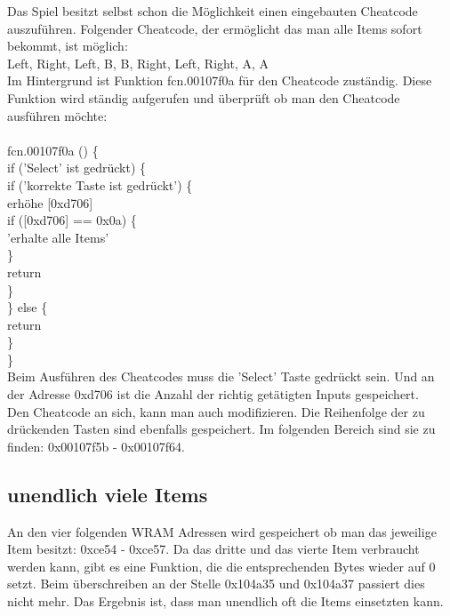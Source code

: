 Das Spiel besitzt selbst schon die Möglichkeit einen eingebauten Cheatcode auszuführen. Folgender Cheatcode, der ermöglicht das man
alle Items sofort bekommt, ist möglich: \\ 
Left, Right, Left, B, B, Right, Left, Right, A, A \\
Im Hintergrund ist Funktion fcn.00107f0a für den Cheatcode zuständig.
Diese Funktion wird ständig aufgerufen und überprüft ob man den Cheatcode ausführen möchte:\\\\
fcn.00107f0a () \{ \\
\hspace*{2em} if ('Select' ist gedrückt) \{ \\
\hspace*{4em} if ('korrekte Taste ist gedrückt') \{\\
\hspace*{6em} erhöhe [0xd706]\\
\hspace*{6em} if ([0xd706] == 0x0a) \{\\
\hspace*{8em} 'erhalte alle Items'\\
\hspace*{6em} \}\\
\hspace*{6em} return\\
\hspace*{4em} \}\\
\hspace*{2em} \} else \{\\
\hspace*{4em} return\\
\hspace*{2em} \}\\
\}\\

Beim Ausführen des Cheatcodes muss die 'Select' Taste gedrückt sein. Und an der Adresse 0xd706 ist die Anzahl der richtig getätigten Inputs gespeichert.\\

Den Cheatcode an sich, kann man auch modifizieren. Die Reihenfolge der zu drückenden Tasten sind ebenfalls gespeichert. Im folgenden Bereich
sind sie zu finden: 0x00107f5b - 0x00107f64.

\subsection{unendlich viele Items}

An den vier folgenden WRAM Adressen wird gespeichert ob man das jeweilige Item besitzt: 0xce54 - 0xce57. Da das dritte und das vierte Item verbraucht werden kann, 
gibt es eine Funktion, die die entsprechenden Bytes wieder auf 0 setzt. Beim überschreiben an der Stelle 0x104a35 und 0x104a37 passiert dies nicht mehr. 
Das Ergebnis ist, dass man unendlich oft die Items einsetzten kann.
